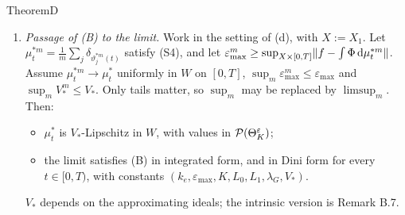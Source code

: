 \begin{thm}{Theorem}{D}
\begin{enumerate}[label=\textup{(\alph*)}]
\item \emph{Passage of (B) to the limit.} Work in the setting of (d), with $X:=X_1$. Let
  $\mu^{*m}_t=\frac1m\sum_j\delta_{\vartheta^{*m}_j(t)}$ satisfy \textup{(S4)}, and let
  $\varepsilon^m_{\max}\ge\sup_{X\times[0,T]}\lVert f-\int\Phi\,\mathrm{d}\mu^{*m}_t\rVert$. Assume $\mu^{*m}_t\to\mu^*_t$ uniformly
  in $W$ on $[0,T]$, $\sup_m\varepsilon^m_{\max}\le\varepsilon_{\max}$ and $\sup_m V^m_*\le V_*$. Only tails matter,
  so $\sup_m$ may be replaced by $\limsup_m$. Then:
  \begin{itemize}
  \item $\mu^*_t$ is $V_*$-Lipschitz in $W$, with values in $\mathcal{P}(\Theta_K^{\varepsilon})$;
  \item the limit satisfies \textup{(B)} in integrated form, and in Dini form for every $t\in[0,T)$, with constants
    $(k_e,\varepsilon_{\max},K,L_0,L_1,\lambda_G,V_*)$.
  \end{itemize}
  $V_*$ depends on the approximating ideals; the intrinsic version is Remark B.7.
\end{enumerate}
\end{thm}


